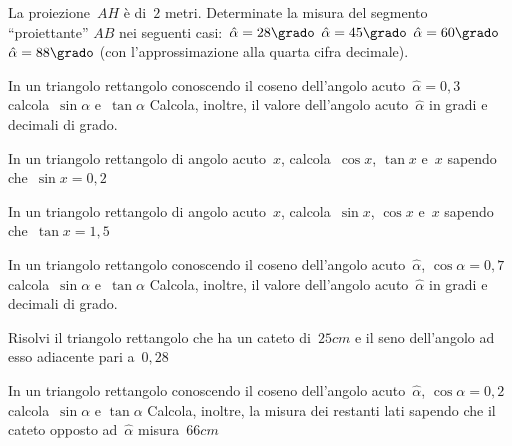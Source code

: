 \begin{multicols}{2}
\begin{esercizio}
\label{ese:G.14}
La proiezione~$AH$ è di~$2$ metri. Determinate la misura 
del segmento ``proiettante'' $AB$ nei seguenti casi:~${\hat{\alpha}}=28\grado$
${\hat{\alpha}}=45\grado$ ${\hat{\alpha}}=60\grado$ ${\hat{\alpha}}=88\grado$ 
(con l'approssimazione alla quarta cifra decimale).
\begin{center}
 
\end{center}
\end{esercizio}

\begin{esercizio}
\label{ese:G.15}
In un triangolo rettangolo conoscendo il coseno dell'angolo 
acuto~$\hat{\alpha}=0,3$ calcola~$\sin \alpha$ e~$\tan \alpha$
Calcola, inoltre, il valore dell'angolo acuto~$\hat{\alpha}$ in gradi e decimali 
di grado.
\end{esercizio}

\begin{esercizio}
\label{ese:G.16}
In un triangolo rettangolo di angolo acuto~$x$, calcola~$\cos x$, $\tan x$ 
e~$x$ sapendo che~$\sin x=0,2$
\end{esercizio}

\begin{esercizio}
\label{ese:G.17}
In un triangolo rettangolo di angolo acuto~$x$, calcola~$\sin x$, $\cos x$ 
e~$x$ sapendo che~$\tan x =1,5$
\end{esercizio}

\begin{esercizio}
\label{ese:G.18}
In un triangolo rettangolo conoscendo il coseno dell'angolo 
acuto~$\hat{\alpha}$, $\cos \alpha = 0,7$ calcola~$\sin \alpha$ e~$\tan \alpha$
Calcola, inoltre, il valore dell'angolo acuto~$\hat{\alpha}$ in gradi e decimali 
di grado.
\end{esercizio}


\begin{esercizio}
\label{ese:G.20}
Risolvi il triangolo rettangolo che ha un cateto di~$25\unit{cm}$ e il seno 
dell'angolo ad esso adiacente pari a~$0,28$
\end{esercizio}

\begin{esercizio}
\label{ese:G.21}
In un triangolo rettangolo conoscendo il coseno dell'angolo 
acuto~$\hat{\alpha}$, $\cos \alpha = 0,2$ calcola~$\sin \alpha$ e
$\tan \alpha$ Calcola, inoltre, la misura dei restanti lati sapendo che il 
cateto opposto ad~$\hat{\alpha}$ misura~$66\unit{cm}$
\end{esercizio}
\end{multicols}

